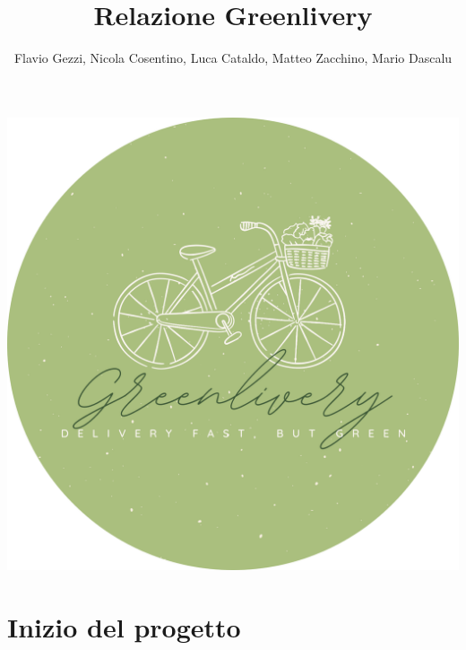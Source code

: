 \documentclass{article}
\begin{document}
\begin{center}
\includegraphics[width=\textwidth]{data/logocircle.png}
\title{Relazione Greenlivery}
\author{Flavio Gezzi, Nicola Cosentino, Luca Cataldo, Matteo Zacchino, Mario Dascalu}
\end{center}
\renewcommand{\contentsname}{Indice}

\maketitle
\tableofcontents

\section{Inizio del progetto}\par
\end{document}
